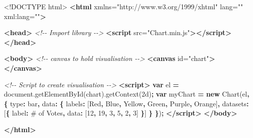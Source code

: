 \documentclass[
]{krantz}
\makeatletter
\newenvironment{Shaded}{\begin{snugshade}}{\end{snugshade}}
\newcommand{\AttributeTok}[1]{\textcolor[rgb]{0.61,0.61,0.61}{#1}}
\newcommand{\CommentTok}[1]{\textcolor[rgb]{0.37,0.37,0.37}{\textit{#1}}}
\newcommand{\DataTypeTok}[1]{\textcolor[rgb]{0.27,0.27,0.27}{#1}}
\newcommand{\DecValTok}[1]{\textcolor[rgb]{0.06,0.06,0.06}{#1}}
\newcommand{\KeywordTok}[1]{\textcolor[rgb]{0.27,0.27,0.27}{\textbf{#1}}}
\newcommand{\NormalTok}[1]{#1}
\newcommand{\OperatorTok}[1]{\textcolor[rgb]{0.43,0.43,0.43}{\textbf{#1}}}
\newcommand{\OtherTok}[1]{\textcolor[rgb]{0.37,0.37,0.37}{#1}}
\newcommand{\StringTok}[1]{\textcolor[rgb]{0.5,0.5,0.5}{#1}}
\newcommand{\VariableTok}[1]{\textcolor[rgb]{0,0,0}{#1}}
\newenvironment{kframe}{%
\medskip{}
\setlength{\fboxsep}{.8em}
 \def\at@end@of@kframe{}%
 \ifinner\ifhmode%
  \def\at@end@of@kframe{\end{minipage}}%
  \begin{minipage}{\columnwidth}%
 \fi\fi%
 \def\FrameCommand##1{\hskip\@totalleftmargin \hskip-\fboxsep
 \colorbox{shadecolor}{##1}\hskip-\fboxsep
     \hskip-\linewidth \hskip-\@totalleftmargin \hskip\columnwidth}%
 \MakeFramed {\advance\hsize-\width
   \@totalleftmargin\z@ \linewidth\hsize
   \@setminipage}}%
 {\par\unskip\endMakeFramed%
 \at@end@of@kframe}
\renewenvironment{Shaded}{\begin{kframe}}{\end{kframe}}
\makeatother
\begin{document}
\begin{Shaded}
\begin{Highlighting}[]
\DataTypeTok{<!DOCTYPE }\NormalTok{html}\DataTypeTok{>}
\KeywordTok{<html}\OtherTok{ xmlns=}\StringTok{"http://www.w3.org/1999/xhtml"}\OtherTok{ lang=}\StringTok{""}\OtherTok{ xml:lang=}\StringTok{""}\KeywordTok{>}

\KeywordTok{<head>}
  \CommentTok{<!{-}{-} Import library {-}{-}>}
  \KeywordTok{<script}\OtherTok{ src=}\StringTok{"Chart.min.js"}\KeywordTok{></script>}
\KeywordTok{</head>}

\KeywordTok{<body>}
  \CommentTok{<!{-}{-} canvas to hold visualisation {-}{-}>}
  \KeywordTok{<canvas}\OtherTok{ id=}\StringTok{"chart"}\KeywordTok{></canvas>}

  \CommentTok{<!{-}{-} Script to create visualisation {-}{-}>}
  \KeywordTok{<script>}
    \KeywordTok{var}\NormalTok{ el }\OperatorTok{=} \VariableTok{document}\NormalTok{.}\AttributeTok{getElementById}\NormalTok{(}\StringTok{\textquotesingle{}chart\textquotesingle{}}\NormalTok{).}\AttributeTok{getContext}\NormalTok{(}\StringTok{\textquotesingle{}2d\textquotesingle{}}\NormalTok{)}\OperatorTok{;}    
    \KeywordTok{var}\NormalTok{ myChart }\OperatorTok{=} \KeywordTok{new} \AttributeTok{Chart}\NormalTok{(el}\OperatorTok{,} \OperatorTok{\{}
      \DataTypeTok{type}\OperatorTok{:} \StringTok{\textquotesingle{}bar\textquotesingle{}}\OperatorTok{,}
      \DataTypeTok{data}\OperatorTok{:} \OperatorTok{\{}
        \DataTypeTok{labels}\OperatorTok{:}\NormalTok{ [}\StringTok{\textquotesingle{}Red\textquotesingle{}}\OperatorTok{,} \StringTok{\textquotesingle{}Blue\textquotesingle{}}\OperatorTok{,} \StringTok{\textquotesingle{}Yellow\textquotesingle{}}\OperatorTok{,} \StringTok{\textquotesingle{}Green\textquotesingle{}}\OperatorTok{,} \StringTok{\textquotesingle{}Purple\textquotesingle{}}\OperatorTok{,} \StringTok{\textquotesingle{}Orange\textquotesingle{}}\NormalTok{]}\OperatorTok{,}
        \DataTypeTok{datasets}\OperatorTok{:}\NormalTok{ [}\OperatorTok{\{}
          \DataTypeTok{label}\OperatorTok{:} \StringTok{\textquotesingle{}\# of Votes\textquotesingle{}}\OperatorTok{,}
          \DataTypeTok{data}\OperatorTok{:}\NormalTok{ [}\DecValTok{12}\OperatorTok{,} \DecValTok{19}\OperatorTok{,} \DecValTok{3}\OperatorTok{,} \DecValTok{5}\OperatorTok{,} \DecValTok{2}\OperatorTok{,} \DecValTok{3}\NormalTok{]}
        \OperatorTok{\}}\NormalTok{]}
      \OperatorTok{\}}
    \OperatorTok{\}}\NormalTok{)}\OperatorTok{;}
  \KeywordTok{</script>}
\KeywordTok{</body>}

\KeywordTok{</html>}
\end{Highlighting}
\end{Shaded}
\end{document}
